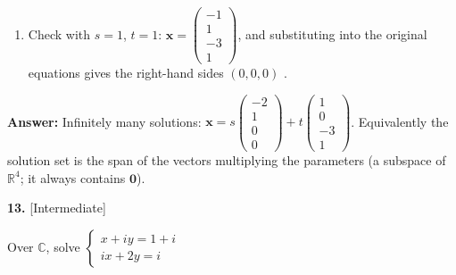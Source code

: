 \documentclass[11pt]{article}
\begin{document}
\begin{tcolorbox}[breakable,colback=ans,colframe=ansb,boxrule=0.5pt,left=4pt,right=4pt,top=2pt,bottom=2pt]
\begin{enumerate}[leftmargin=2.2em,itemsep=1pt,topsep=1pt,label=\textbf{Step \arabic*.}]
\item Check with $s=1$, $t=1$: $\mathbf x=\begin{pmatrix}-1\\1\\-3\\1\end{pmatrix}$, and substituting into the original equations gives the right-hand sides $(0,0,0)$ \checkmark.
\end{enumerate}\textbf{Answer:} Infinitely many solutions: $\mathbf x=s\begin{pmatrix}-2\\1\\0\\0\end{pmatrix}+t\begin{pmatrix}1\\0\\-3\\1\end{pmatrix}$. Equivalently the solution set is the span of the vectors multiplying the parameters (a subspace of $\mathbb{R}^{4}$; it always contains $\mathbf 0$).\end{tcolorbox}
\par\vspace{2pt}
\begin{minipage}{\linewidth}\textbf{13.} \hfill{\scriptsize\color{ink}[Intermediate]}\par\nopagebreak Over $\mathbb{C}$, solve $\begin{cases}x+iy=1+i\\ ix+2y=i\end{cases}$
\end{minipage}\par\nopagebreak
\end{document}

